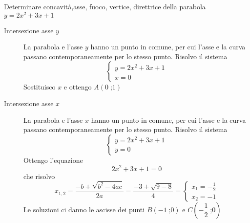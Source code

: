 	Determinare concavità,asse, fuoco, vertice, direttrice della parabola $y=2x^2+3x+1$
	\begin{description}
		\item[Intersezione asse $y$] La parabola e l'asse $y$ hanno un punto in comune, per cui l'asse e la curva passano contemporaneamente per lo stesso punto. Risolvo il sistema \[\begin{cases}
		y=2x^2+3x+1\\
		x=0
		\end{cases}\] Sostituisco $x$ e ottengo $A\left(0\;\text{;}1\right)$
			\item[Intersezione asse $x$] La parabola e l'asse $x$ hanno un punto in comune, per cui l'asse e la curva passano contemporaneamente per lo stesso punto. Risolvo il sistema \[\begin{cases}
		y=2x^2+3x+1\\
		y=0
		\end{cases}\] Ottengo l'equazione \[2x^2+3x+1=0\] che risolvo
		\[x_{1,2}=\dfrac{-b\pm\sqrt{b^2-4ac}}{2a}=\dfrac{-3\pm\sqrt{9-8}}{4}=\begin{cases}
		x_1=-\frac{1}{2}\\
		x_2=-1
		\end{cases} \] Le soluzioni ci danno le ascisse dei  punti $B\left(-1\;\text{;}0\right)$ e $C\left(-\dfrac{1}{2}\;\text{;}0\right)$
	\end{description}
